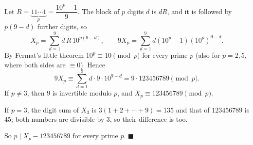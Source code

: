 Let $R=\underbrace{11\cdots1}_{p}=\dfrac{10^p-1}{9}$. The block of $p$ digits $d$ is $dR$, and it is followed by $p(9-d)$ further digits, so
\[
X_p=\sum_{d=1}^{9}d\,R\,10^{p(9-d)},\qquad 9X_p=\sum_{d=1}^{9}d\left(10^p-1\right)\left(10^p\right)^{9-d}.
\]
By Fermat's little theorem $10^p\equiv10\pmod p$ for every prime $p$ (also for $p=2,5$, where both sides are $\equiv0$). Hence
\[
9X_p\equiv\sum_{d=1}^{9}d\cdot9\cdot10^{9-d}=9\cdot123456789\pmod p .
\]
If $p\ne3$, then $9$ is invertible modulo $p$, and $X_p\equiv123456789\pmod p$.

If $p=3$, the digit sum of $X_3$ is $3(1+2+\cdots+9)=135$ and that of $123456789$ is $45$; both numbers are divisible by $3$, so their difference is too.

So $p\mid X_p-123456789$ for every prime $p$. $\blacksquare$
